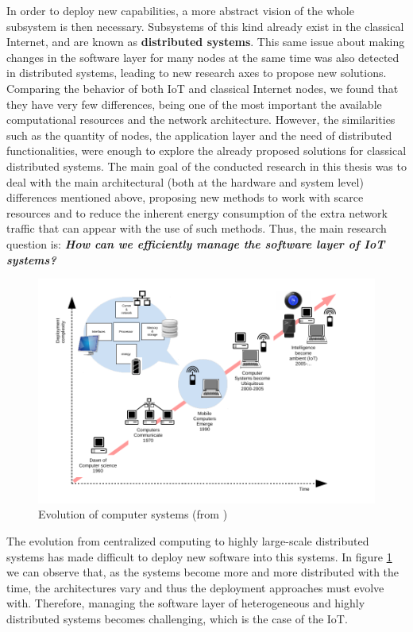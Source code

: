 In order to deploy new capabilities, a more abstract vision of the whole subsystem is then necessary.
Subsystems of this kind already exist in the classical Internet, and are known as \textbf{distributed systems}\cite{coulouris2005distributed}.
This same issue about making changes in the software layer for many nodes at the same time was also detected in distributed systems, leading to new research axes to propose new solutions.
Comparing the behavior of both IoT and classical Internet nodes, we found that they have very few differences, being one of the most important the available computational resources and the network architecture.
However, the similarities such as the quantity of nodes, the application layer and the need of distributed functionalities, were enough to explore the already proposed solutions for classical distributed systems.
The main goal of the conducted research in this thesis was to deal with the main architectural (both at the hardware and system level) differences mentioned above, proposing new methods to work with scarce resources and to reduce the inherent energy consumption of the extra network traffic that can appear with the use of such methods.
Thus, the main research question is: \textit{\textbf{How can we efficiently manage the software layer of IoT systems?}}

\begin{figure}[htb]
	\centering
	\includegraphics[width=1\columnwidth]{chapters/background.images/evolutionCompSys.pdf}
	\caption{Evolution of computer systems (from \cite{waldner2007nano})}
	\label{fig:EvolCompSyst}
\end{figure}

The evolution from centralized computing to highly large-scale distributed systems has made difficult to deploy new software into this systems.
In figure \ref{fig:EvolCompSyst} we can observe that, as the systems become more and more distributed with the time, the architectures vary and thus the deployment approaches must evolve with.
Therefore, managing the software layer of heterogeneous and highly distributed systems becomes challenging, which is the case of the IoT.

